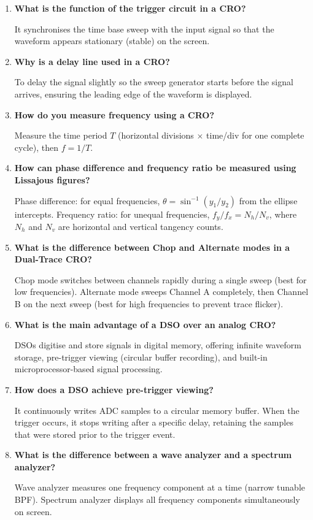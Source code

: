 \documentclass[12pt,a4paper]{article}
\newcommand{\Q}[1]{\textbf{#1}\par\noindent\ignorespaces}
\begin{document}
\vspace{5pt}

\begin{tcolorbox}[exambox, title={\textbf{Frequently Asked / Viva Questions}}]
\begin{enumerate}[topsep=0pt, label=\textbf{Q\arabic*.}, itemsep=5pt]
  \item \Q{What is the function of the trigger circuit in a CRO?}
    It synchronises the time base sweep with the input signal so that the waveform appears stationary (stable) on the screen.
  \item \Q{Why is a delay line used in a CRO?}
    To delay the signal slightly so the sweep generator starts before the signal arrives, ensuring the leading edge of the waveform is displayed.
  \item \Q{How do you measure frequency using a CRO?}
    Measure the time period $T$ (horizontal divisions $\times$ time/div for one complete cycle), then $f = 1/T$.
  \item \Q{How can phase difference and frequency ratio be measured using Lissajous figures?}
    Phase difference: for equal frequencies, $\theta = \sin^{-1}(y_1/y_2)$ from the ellipse intercepts. Frequency ratio: for unequal frequencies, $f_y/f_x = N_h/N_v$, where $N_h$ and $N_v$ are horizontal and vertical tangency counts.
  \item \Q{What is the difference between Chop and Alternate modes in a Dual-Trace CRO?}
    Chop mode switches between channels rapidly during a single sweep (best for low frequencies). Alternate mode sweeps Channel A completely, then Channel B on the next sweep (best for high frequencies to prevent trace flicker).
  \item \Q{What is the main advantage of a DSO over an analog CRO?}
    DSOs digitise and store signals in digital memory, offering infinite waveform storage, pre-trigger viewing (circular buffer recording), and built-in microprocessor-based signal processing.
  \item \Q{How does a DSO achieve pre-trigger viewing?}
    It continuously writes ADC samples to a circular memory buffer. When the trigger occurs, it stops writing after a specific delay, retaining the samples that were stored prior to the trigger event.
  \item \Q{What is the difference between a wave analyzer and a spectrum analyzer?}
    Wave analyzer measures one frequency component at a time (narrow tunable BPF). Spectrum analyzer displays all frequency components simultaneously on screen.

\end{enumerate}
\end{tcolorbox}
\end{document}
